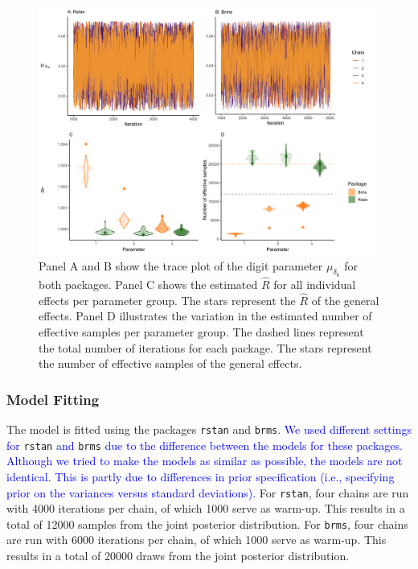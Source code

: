 \documentclass[
  english,
  doc,floatsintext]{apa6}
\begin{document}
\begin{figure}[H]

\includegraphics[width=1\linewidth]{I - Images/Fig8_traceplots3pnew_v2} \hfill{}

\caption{Panel A and B show the trace plot of the digit parameter $\mu_{\delta_{6}}$ for both packages. Panel C shows the estimated $\hat{R}$ for all individual effects per parameter group. The stars represent the $\hat{R}$ of the general effects. Panel D illustrates the variation in the estimated number of effective samples per parameter group. The dashed lines represent the total number of iterations for each package. The stars represent the number of effective samples of the general effects.}\label{fig:traceplots3p}
\end{figure}

\hypertarget{model-fitting}{%
\subsubsection{Model Fitting}\label{model-fitting}}

The model is fitted using the packages \texttt{rstan} and \texttt{brms}. \textcolor{blue}{We used different settings for} \texttt{rstan} \textcolor{blue}{and} \texttt{brms} \textcolor{blue}{due to the difference between the models for these packages. Although we tried to make the models as similar as possible, the models are not identical. This is partly due to differences in prior specification (i.e., specifying prior on the variances versus standard deviations).} For \texttt{rstan}, four chains are run with 4000 iterations per chain, of which 1000 serve as warm-up. This results in a total of 12000 samples from the joint posterior distribution. For \texttt{brms}, four chains are run with 6000 iterations per chain, of which 1000 serve as warm-up. This results in a total of 20000 draws from the joint posterior distribution.
\end{document}
